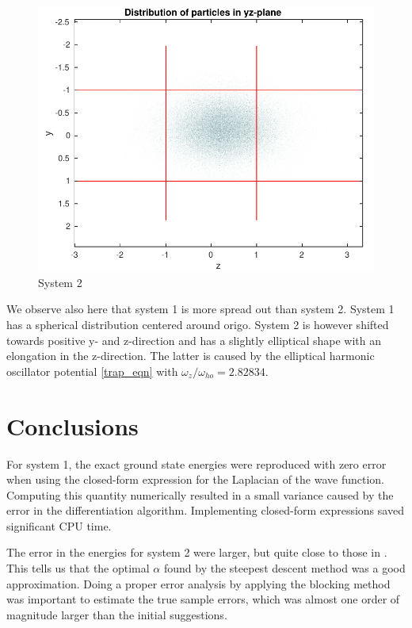 \documentclass[english, a4paper]{article}
\begin{document}
\begin{figure}[H]
\begin{center}
  \includegraphics[width = 140mm]{radialDist2YZ.pdf}
  \caption{System 2}\label{fig:density4}
  \end{center}
\end{figure}
We observe also here that system 1 is more spread out than system 2. System 1 has a spherical distribution
centered around origo. System 2 is however shifted towards positive y- and z-direction and has a slightly 
elliptical shape with an elongation in the z-direction. 
The latter is caused by the elliptical harmonic oscillator potential \eqref{trap_eqn} with
$\omega_z / \omega_{ho} = 2.82834$.


\section{Conclusions}

For system 1, the exact ground state energies were reproduced with zero error when using the closed-form expression
for the Laplacian of the wave function. Computing this quantity numerically resulted in a small variance caused by 
the error in the differentiation algorithm. Implementing closed-form expressions saved significant CPU time. 

The error in the energies for system 2 were larger, but quite close to those in \cite{ref1}. This tells us 
that the optimal $\alpha$ found by the steepest descent method was a good approximation. 
Doing a proper error analysis by applying the blocking method was important to estimate the true sample errors, which was
almost one order of magnitude larger than the initial suggestions. 
\end{document}
